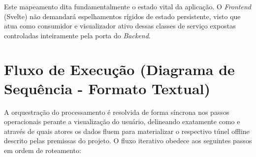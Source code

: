 \documentclass{scrreprt}
\begin{document}
Este mapeamento dita fundamentalmente o estado vital da aplicação. O \textit{Frontend} (Svelte) não demandará espelhamentos rígidos de estado persistente, visto que atua como consumidor e visualizador ativo dessas classes de serviço expostas controladas inteiramente pela porta do \textit{Backend}.

\section{Fluxo de Execução (Diagrama de Sequência - Formato Textual)}

A orquestração do processamento é resolvida de forma síncrona nos passos operacionais perante a visualização do usuário, delineando exatamente como e através de quais atores os dados fluem para materializar o respectivo túnel offline descrito pelas premissas do projeto. O fluxo iterativo obedece aos seguintes passos em ordem de roteamento:
\end{document}
